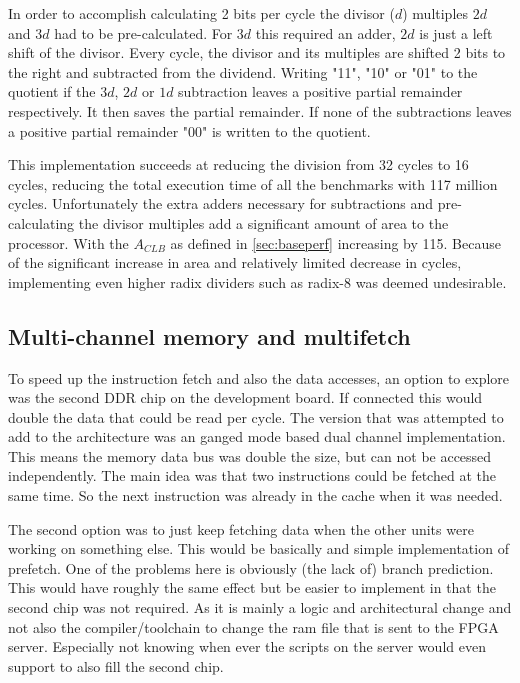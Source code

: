 \documentclass[final]{article}
\begin{document}
In order to accomplish calculating 2 bits per cycle the divisor ($d$) multiples $2d$ and $3d$ had to be pre-calculated.
For $3d$ this required an adder, $2d$ is just a left shift of the divisor.
Every cycle, the divisor and its multiples are shifted 2 bits to the right and subtracted from the dividend.
Writing "11", "10" or "01" to the quotient if the $3d$, $2d$ or $1d$ subtraction leaves a positive partial remainder respectively.
It then saves the partial remainder.
If none of the subtractions leaves a positive partial remainder "00" is written to the quotient.

This implementation succeeds at reducing the division from 32 cycles to 16 cycles, reducing the total execution time of all the benchmarks with 117 million cycles.
Unfortunately the extra adders necessary for subtractions and pre-calculating the divisor multiples add a significant amount of area to the processor.
With the $A_{CLB}$ as defined in \cref{sec:baseperf} increasing by 115.
Because of the significant increase in area and relatively limited decrease in cycles, implementing even higher radix dividers such as radix-8 was deemed undesirable.

\subsection{Multi-channel memory and multifetch}
To speed up the instruction fetch and also the data accesses, an option to explore was the second DDR chip on the development board.
If connected this would double the data that could be read per cycle.
The version that was attempted to add to the architecture was an ganged mode based dual channel implementation.
This means the memory data bus was double the size, but can not be accessed independently.
The main idea was that two instructions could be fetched at the same time.
So the next instruction was already in the cache when it was needed.

The second option was to just keep fetching data when the other units were working on something else.
This would be basically and simple implementation of prefetch.
One of the problems here is obviously (the lack of) branch prediction.
This would have roughly the same effect but be easier to implement in that the second chip was not required.
As it is mainly a logic and architectural change and not also the compiler/toolchain to change the ram file that is sent to the FPGA server.
Especially not knowing when ever the scripts on the server would even support to also fill the second chip.
\end{document}
